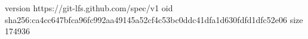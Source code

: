 version https://git-lfs.github.com/spec/v1
oid sha256:ca4cc647bfca96fc992aa49145a52cf4c53bc0ddc41dfa1d630fdfd1dfc52e06
size 174936
